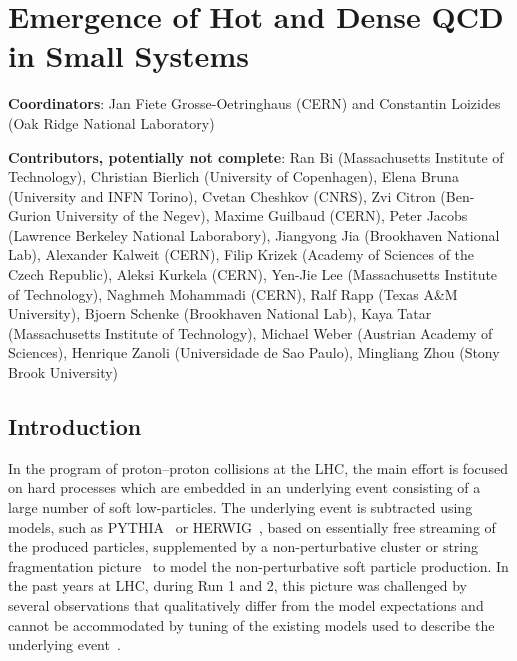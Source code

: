 \documentclass[../report.tex]{subfiles}
\begin{document}
\section{Emergence of Hot and Dense QCD in Small Systems}
\label{chapter:smallsystems}

{ \small
\noindent \textbf{Coordinators}: Jan Fiete Grosse-Oetringhaus (CERN) and Constantin Loizides (Oak Ridge National Laboratory)

\noindent \textbf{Contributors, potentially not complete}:
Ran Bi (Massachusetts Institute of Technology),
Christian Bierlich (University of Copenhagen),
Elena Bruna (University and INFN Torino),
Cvetan Cheshkov (CNRS),
Zvi Citron (Ben-Gurion University of the Negev),
Maxime Guilbaud (CERN),
Peter Jacobs (Lawrence Berkeley National Laborabory),
Jiangyong Jia (Brookhaven National Lab),
Alexander Kalweit (CERN),
Filip Krizek (Academy of Sciences of the Czech Republic),
Aleksi Kurkela (CERN),
Yen-Jie Lee (Massachusetts Institute of Technology),
Naghmeh Mohammadi (CERN),
Ralf Rapp (Texas A\&M University),
Bjoern Schenke (Brookhaven National Lab),
Kaya Tatar (Massachusetts Institute of Technology),
Michael Weber (Austrian Academy of Sciences),
Henrique Zanoli (Universidade de Sao Paulo),
Mingliang Zhou (Stony Brook University)
}

\subsection{Introduction}

In the program of proton--proton collisions at the LHC, the main effort is focused on hard processes which are embedded in an underlying event consisting of a large number of soft low-\pT particles. The underlying event is subtracted using models, such as PYTHIA~\cite{Sjostrand:2014zea} or HERWIG~\cite{Bellm:2015jjp}, based on essentially free streaming of the produced particles, supplemented by a non-perturbative cluster or string fragmentation picture~\cite{Andersson:1983ia,Webber:1983if} to model the non-perturbative soft particle production.
In the past years at LHC, during Run 1 and 2, this picture was challenged by several observations that qualitatively differ from the model expectations and cannot be accommodated by tuning of the existing models used to describe the underlying event~\cite{Fischer:2016zzs}.
\end{document}

